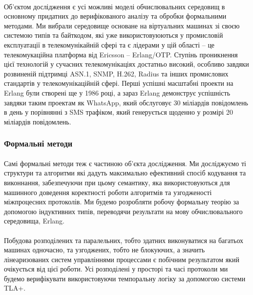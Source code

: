 \documentclass[11pt,oneside]{article}
\begin{document}
   \paragraph{}
   Об’єктом дослідження є усі можливі моделі обчислювальних середовищ в основному придатних
   до верифікованого аналізу та обробки формальними методами. Ми вибрали середовище
   основане на віртуальних машинах зі своєю системою типів та байткодом, які уже
   використовуюються у промисловій експлуатації в телекомунікайній сфері та є лідерами
   у цій області -- це телекомукаційна платформа від Ericsson -- Erlang/OTP. Ступінь проникнення
   цієї технологій у сучасних телекомунікаціях достатньо високий, особливо завдяки
   розвиненій підтримці ASN.1, SNMP, H.262, Radius та інших промислових стандартів
   у телекомунікаційній сфері. Перші успішні масштабні проекти на Erlang були створені ще у
   1986 році, а зараз Erlang демонструє успішність завдяки таким проектам як WhatsApp, який
   обслуговує 30 міліардів повідомлень в день у порівнянні з SMS трафіком,
   який генерується щоденно у розмірі 20 міліардів повідомлень.

\newpage

\subsubsection{Формальні методи}
\vspace{0.5cm}

   \paragraph{}
   Самі формальні методи теж є частиною об’єкта дослідження. Ми досліджуємо ті структури
   та алгоритми які дадуть максимально ефективний спосіб кодування та виконнання,
   забезпечуючи при цьому семантику, яка використовуються для машинного доведення
   коректності роботи алгоритмів та узгодженості міжпроцесних протоколів.
   Ми будемо розробляти робочу формальну теорію за допомогою індуктивних типів,
   переводячи результати на мову обчислювального середовища, Erlang.

   \paragraph{}
   Побудова розподілених та паралельних, тобто здатних виконуватися на багатьох машинах одночасно, та
   узгоджених, тобто не блокуючих, а значить лінеаризованих систем управліннями процессами є побічним
   результатом який очікується від цієї роботи. Усі розподілені у просторі та часі
   протоколи ми будемо верифікувати використовуючи темпоральну логіку за допомогою системи TLA+.
\end{document}
